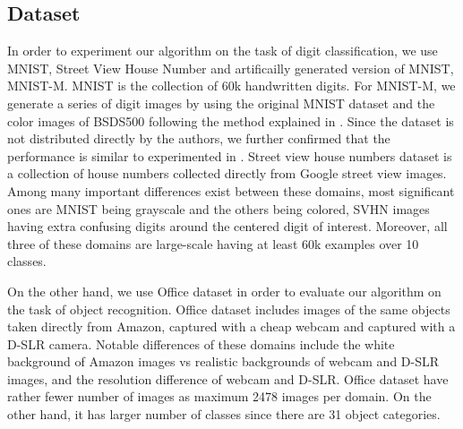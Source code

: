 \begin{table}[ht]
\caption{Accuracy of our method and the digit classification task.}
\label{tab:res2}
\begin{sc}
\begin{small}
\end{small}
\end{sc}
\end{table}
\subsection{Dataset}
In order to experiment our algorithm on the task of digit classification, we use MNIST\cite{mnist}, Street View House Number\cite{svhn} and artificailly generated version of MNIST, MNIST-M\cite{ganin15}. MNIST is the collection of 60k handwritten digits. For MNIST-M, we generate a series of digit images by using the original MNIST dataset and the color images of BSDS500\cite{bsds500} following the method explained in \cite{ganin15}. Since the dataset is not distributed directly by the authors, we further confirmed that the performance is similar to experimented in \cite{ganin15}. Street view house numbers dataset is a collection of house numbers collected directly from Google street view images. Among many important differences exist between these domains, most significant ones are MNIST being grayscale and the others being colored, SVHN images having extra confusing digits around the centered digit of interest. Moreover, all three of these domains are large-scale having at least 60k examples over 10 classes. 

On the other hand, we use Office\cite{office} dataset in order to evaluate our algorithm on the task of object recognition. Office dataset includes images of the same objects taken directly from Amazon, captured with a cheap webcam and captured with a D-SLR camera. Notable differences of these domains include the white background of Amazon images vs realistic backgrounds of webcam and D-SLR images, and the resolution difference of webcam and D-SLR. Office dataset have rather fewer number of images as maximum 2478 images per domain. On the other hand, it has larger number of classes since there are 31 object categories.

